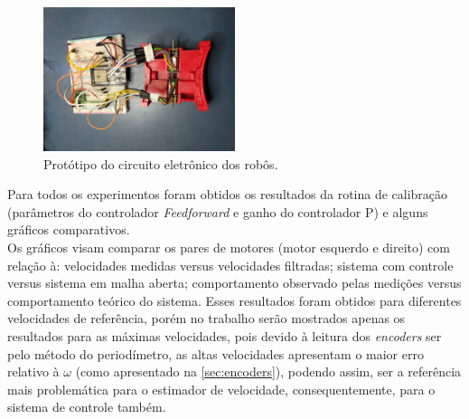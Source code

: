 \begin{figure}[H]
    \centering
    \includegraphics[width=0.5\textwidth]{figuras/robo/protoboard.jpg}
    \caption{Protótipo do circuito eletrônico dos robôs.}
    \label{fig:prototipo}
\end{figure}

Para todos os experimentos foram obtidos os resultados da rotina de calibração (parâmetros do controlador \emph{Feedforward} e ganho do controlador P) e alguns gráficos comparativos. \\

Os gráficos visam comparar os pares de motores (motor esquerdo e direito) com relação à: velocidades medidas versus velocidades filtradas; sistema com controle versus sistema em malha aberta; comportamento observado pelas medições versus comportamento teórico do sistema. Esses resultados foram obtidos para diferentes velocidades de referência, porém no trabalho serão mostrados apenas os resultados para as máximas velocidades, pois devido à leitura dos \emph{encoders} ser pelo método do periodímetro, as altas velocidades apresentam o maior erro relativo à $\omega$ (como apresentado na \autoref{sec:encoders}), podendo assim, ser a referência mais problemática para o estimador de velocidade, consequentemente, para o sistema de controle também.\\



